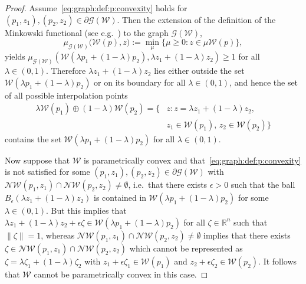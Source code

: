 \documentclass[journal]{IEEEtran}
\theoremstyle{remark}
\theoremstyle{definition}
\begin{document}
%
\begin{proof}
%
Assume~\eqref{eq:graph:def:p:convexity} holds for $(p_1,z_1),(p_2,z_2)\in\partial\mathscr G(\mathcal W)$.
%
Then the extension of the definition of the Minkowski functional (see e.g.~\cite{Rudin:91}) to the graph $\mathscr G(\mathcal W)$,
\[
\mu_{\mathscr G(\mathcal W)} \bigl(
\mathcal W(p), z \bigr)
:= \min_\mu \{\mu \geq 0 : z \in \mu \mathcal W(p)\},
\]
yields $\mu_{\mathscr G(\mathcal W)}\left(\mathcal W(\lambda p_1 + (1-\lambda)p_2),\lambda z_1+(1-\lambda)z_2\right)\geq1$ for all $\lambda\in(0,1)$. Therefore $\lambda z_1 + (1-\lambda) z_2$
lies either outside the set $\mathcal W(\lambda p_1+(1-\lambda)p_2)$ or on its boundary for all $\lambda\in(0,1)$, and hence the set of all possible interpolation points 
%
\[
\begin{split}
  \lambda \mathcal W(p_1)\oplus (1-\lambda)\mathcal W(p_2) = \{&z : z=\lambda z_1 + (1-\lambda) z_2,\\ &z_1\in\mathcal  W(p_1),\, z_2\in\mathcal W(p_2)\}
\end{split}
\]
%
contains the set $\mathcal W(\lambda p_1 + (1-\lambda)p_2)$ for all $\lambda\in(0,1)$.
%

Now suppose that $\mathcal W$ is parametrically convex and that~\eqref{eq:graph:def:p:convexity} is not satisfied for 
some $(p_1,z_1),(p_2,z_2)\in\partial\mathscr G(\mathcal W)$ with $\mathcal N\mathcal W(p_1,z_1)\cap\mathcal 
N\mathcal W(p_2,z_2)\neq\emptyset$, 
%
i.e.~that there exists $\epsilon>0$ such that the ball
$B_\epsilon(\lambda z_1 + (1-\lambda)z_2 )$
is contained in $\mathcal W(\lambda p_1 + (1-\lambda)p_2)$ for some $\lambda \in (0,1)$.
%
But this implies that $\lambda z_1 + (1-\lambda) z_2 + \epsilon\zeta \in \mathcal W(\lambda p_1+(1-\lambda)p_2)$  for all $\zeta\in\mathbb R^n$ such that $\|\zeta\| = 1$, whereas
$\mathcal N\mathcal W(p_1,z_1)\cap\mathcal N\mathcal W(p_2,z_2)\neq\emptyset$ implies that there exists 
$\zeta \in\mathcal N\mathcal W(p_1,z_1)\cap\mathcal N\mathcal W(p_2,z_2)$ which cannot be represented as
$\zeta =\lambda \zeta_1+
(1-\lambda)\zeta_2$
with $z_1 + \epsilon \zeta_1\in\mathcal W(p_1)$ and $z_2  + \epsilon \zeta_2\in\mathcal W(p_2)$.
%
It follows that $\mathcal W$ cannot be parametrically convex in this case.
\end{proof}
%
\end{document}
